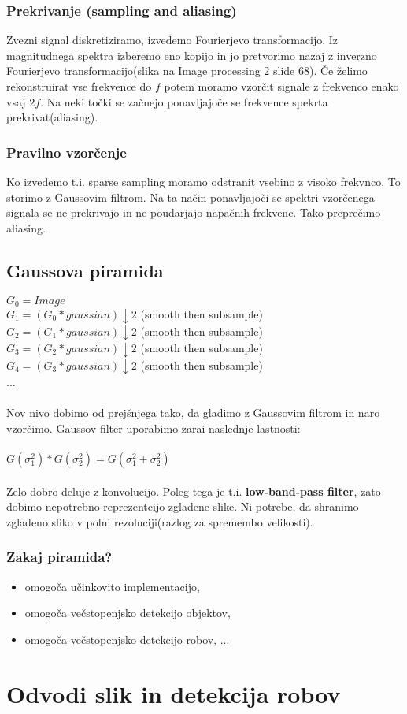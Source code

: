 \documentclass[11pt]{article}
\begin{document}
\subsubsection{Prekrivanje (sampling and aliasing)}
Zvezni signal diskretiziramo, izvedemo Fourierjevo transformacijo. Iz magnitudnega spektra izberemo eno kopijo in jo pretvorimo nazaj z inverzno Fourierjevo transformacijo(slika na Image processing 2 slide 68). \v{C}e \v{z}elimo rekonstruirat vse frekvence do $f$ potem moramo vzor\v{c}it signale z frekvenco enako vsaj $2f$. Na neki to\v{c}ki se za\v{c}nejo ponavljajo\v{c}e se frekvence spekrta prekrivat(aliasing).

\subsubsection{Pravilno vzor\v{c}enje}
Ko izvedemo t.i. sparse sampling moramo odstranit vsebino z visoko frekvnco. To storimo z Gaussovim filtrom. Na ta na\v{c}in ponavljajo\v{c}i se spektri vzor\v{c}enega signala se ne prekrivajo in ne poudarjajo napa\v{c}nih frekvenc. Tako prepre\v{c}imo aliasing.

\newpage

\subsection{Gaussova piramida}
$G_0 = Image$ \\
$G_1 = (G_0 * gaussian) \downarrow 2$ (smooth then subsample) \\
$G_2 = (G_1 * gaussian) \downarrow 2$ (smooth then subsample) \\
$G_3 = (G_2 * gaussian) \downarrow 2$ (smooth then subsample) \\
$G_4 = (G_3 * gaussian) \downarrow 2$ (smooth then subsample) \\
... \\
\\
Nov nivo dobimo od prej\v{s}njega tako, da gladimo z Gaussovim filtrom in naro vzor\v{c}imo. Gaussov filter uporabimo zarai naslednje lastnosti: \\
\\
$G(\sigma_1^2) *G(\sigma_2^2) = G(\sigma_1^2 + \sigma_2^2)$ \\
\\
Zelo dobro deluje z konvolucijo. Poleg tega je t.i. \textbf{low-band-pass filter}, zato dobimo nepotrebno reprezentcijo zgladene slike. Ni potrebe, da shranimo zgladeno sliko v polni rezoluciji(razlog za spremembo velikosti).

\subsubsection{Zakaj piramida?}
\begin{itemize}
\item omogo\v{c}a u\v{c}inkovito implementacijo,
\item omogo\v{c}a ve\v{c}stopenjsko detekcijo objektov,
\item omogo\v{c}a ve\v{c}stopenjsko detekcijo robov, ...
\end{itemize}

\newpage

\section{Odvodi slik in detekcija robov}
\end{document}
